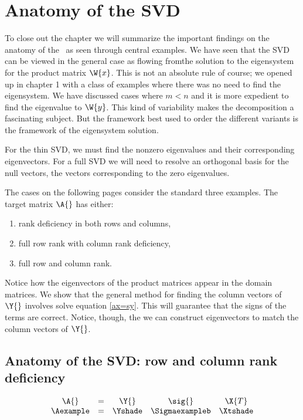 \section{Anatomy of the SVD}
To close out the chapter we will summarize the important findings on the anatomy of the \svdl \ as seen through central examples. We have seen that the SVD can be viewed in the general case as flowing fromthe solution to the eigensystem for the product matrix $\W{x}$. This is not an absolute rule of course; we opened up in chapter 1 with a class of examples where there was no need to find the eigensystem. We have discussed cases where $m<n$ and it is more expedient to find the eigenvalue to $\W{y}$. This kind of variability makes the decomposition a fascinating subject. But the framework best used to order the different variants is the framework of the eigensystem solution. 

For the thin SVD, we must find the nonzero eigenvalues and their corresponding eigenvectors. For a full SVD we will need to resolve an orthogonal basis for the null vectors, the vectors corresponding to the zero eigenvalues.

The cases on the following pages consider the standard three examples. The target matrix $\A{}$ has either:
\begin{enumerate}
\item rank deficiency in both rows and columns,
\item full row rank with column rank deficiency,
\item full row and column rank.
\end{enumerate}

Notice how the eigenvectors of the product matrices appear in the domain matrices. We show that the general method for finding the column vectors of $\Y{}$ involves solve equation \eqref{ax=sy}. This will guarantee that the signs of the terms are correct.  Notice, though, the we can construct eigenvectors to match the column vectors of $\Y{}$.

\break
\subsection[Anatomy of the SVD: row, column rank deficiency]{Anatomy of the SVD: row and column rank deficiency}

\begin{equation*}
  \begin{array}{ccccc}
    \A{} &=& \Y{} & \sig{} & \X{T} \\
    \Aexample & = & \Yshade & \Sigmaexampleb & \Xtshade
  \end{array}
\end{equation*}

